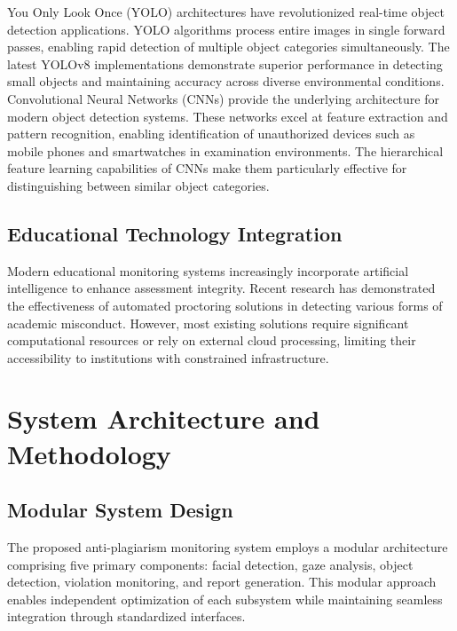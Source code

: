 \documentclass[conference]{IEEEtran}
\begin{document}
You Only Look Once (YOLO) architectures have revolutionized real-time object detection applications. YOLO algorithms process entire images in single forward passes, enabling rapid detection of multiple object categories simultaneously\cite{wang2022object}. The latest YOLOv8 implementations demonstrate superior performance in detecting small objects and maintaining accuracy across diverse environmental conditions\cite{v7labs2023yolo}.
Convolutional Neural Networks (CNNs) provide the underlying architecture for modern object detection systems\cite{goodfellow2016deep}. These networks excel at feature extraction and pattern recognition, enabling identification of unauthorized devices such as mobile phones and smartwatches in examination environments. The hierarchical feature learning capabilities of CNNs make them particularly effective for distinguishing between similar object categories\cite{paszke2019pytorch}.

\subsection{Educational Technology Integration}

Modern educational monitoring systems increasingly incorporate artificial intelligence to enhance assessment integrity\cite{russell2020artificial}. Recent research has demonstrated the effectiveness of automated proctoring solutions in detecting various forms of academic misconduct\cite{honorlock2023detecting}. However, most existing solutions require significant computational resources or rely on external cloud processing, limiting their accessibility to institutions with constrained infrastructure.

\section{System Architecture and Methodology}

\subsection{Modular System Design}

The proposed anti-plagiarism monitoring system employs a modular architecture comprising five primary components: facial detection, gaze analysis, object detection, violation monitoring, and report generation. This modular approach enables independent optimization of each subsystem while maintaining seamless integration through standardized interfaces.
\end{document}
